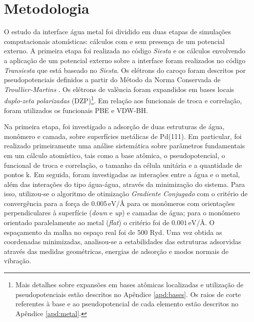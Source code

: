 \chapter{Metodologia}

O estudo da interface água metal foi dividido em duas etapas de simulações computacionais atomísticas: cálculos com e sem presença de um potencial externo. A primeira etapa foi realizada no código \textit{Siesta}\cite{siesta} e os cálculos envolvendo a aplicação de um potencial externo sobre a interface foram realizados no código \textit{Transiesta}\cite{transiesta1,transiesta2,transiesta3} que está baseado no \textit{Siesta}. Os elétrons do caroço foram descritos por pseudopotenciais definidos a partir do Método da Norma Conservada de \textit{Troullier-Martins} \cite{troullier_martins}. Os elétrons de valência foram expandidos em bases locais \textit{duplo-zeta polarizadas} (DZP)\footnote{Mais detalhes sobre expansões em bases atômicas localizadas e utilização de pseudopotenciais estão descritos no Apêndice \ref{apd:bases}. Os raios de corte referentes à base e ao pseudopotencial de cada elemento estão descritos no Apêndice \ref{apd:metal}.}. Em relação aos funcionais de troca e correlação, foram utilizados os funcionais PBE \cite{PBE} e VDW-BH\cite{vdw-bh}. 

Na primeira etapa, foi investigado a adsorção de duas estruturas de água, monômero e camada, sobre superfícies metálicas de Pd(111). Em particular, foi realizado primeiramente uma análise sistemática sobre parâmetros fundamentais em um cálculo atomístico, tais como a base atômica, o pseudopotencial, o funcional de troca e correlação, o tamanho da célula unitária e a quantidade de pontos k. Em seguida, foram investigadas as interações entre a água e o metal, além das interações do tipo água-água, através da minimização do sistema. Para isso, utilizou-se o algoritmo de otimização \textit{Gradiente Conjugado} com o critério de convergência para a força de $0.005\,\si{\eV}/\si{\angstrom}$ para os monômeros com orientações perpendiculares à superfície (\textit{down} e \textit{up}) e camadas de água; para o monômero orientado paralelamente ao metal (\textit{flat}) o critério foi de $0.001\,\si{\eV}/\si{\angstrom}$. O espaçamento da malha no espaço real foi de 500 Ryd. Uma vez obtida as coordenadas minimizadas, analisou-se a estabilidades das estruturas adsorvidas através das medidas geométricas, energias de adsorção e modos normais de vibração. 

